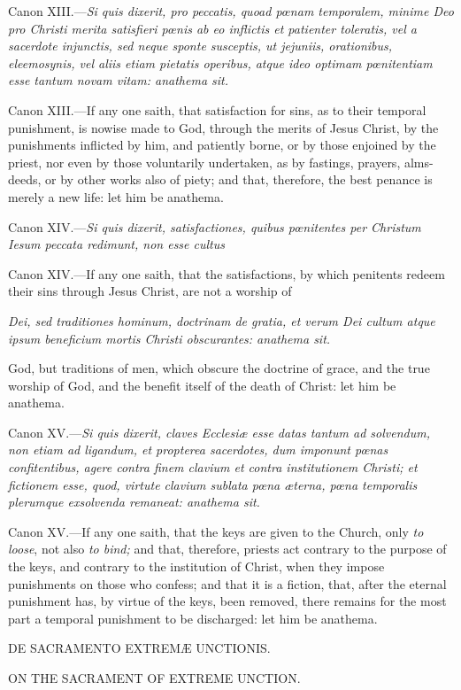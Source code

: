Canon XIII.—\emph{Si quis dixerit, pro peccatis, quoad pœnam temporalem, minime Deo pro Christi merita satisfieri pœnis ab eo inflictis et patienter toleratis, vel a sacerdote injunctis, sed neque sponte susceptis, ut jejuniis, orationibus, eleemosynis, vel aliis etiam pietatis operibus, atque ideo optimam pœnitentiam esse tantum novam vitam: anathema sit.}

Canon XIII.—If any one saith, that satisfaction for sins, as to their temporal punishment, is nowise made to God, through the merits of Jesus Christ, by the punishments inflicted by him, and patiently borne, or by those enjoined by the priest, nor even by those voluntarily undertaken, as by fastings, prayers, alms-deeds, or by other works also of piety; and that, therefore, the best penance is merely a new life: let him be anathema.

Canon XIV.—\emph{Si quis dixerit, satisfactiones, quibus pœnitentes per Christum Iesum peccata redimunt, non esse cultus }

Canon XIV.—If any one saith, that the satisfactions, by which penitents redeem their sins through Jesus Christ, are not a worship of

\emph{Dei, sed traditiones hominum, doctrinam de gratia, et verum Dei cultum atque ipsum beneficium mortis Christi obscurantes: anathema sit.}

God, but traditions of men, which obscure the doctrine of grace, and the true worship of God, and the benefit itself of the death of Christ: let him be anathema.

Canon XV.—\emph{Si quis dixerit, claves Ecclesiæ esse datas tantum ad solvendum, non etiam ad ligandum, et propterea sacerdotes, dum imponunt pœnas confitentibus, agere contra finem clavium et contra institutionem Christi; et fictionem esse, quod, virtute clavium sublata pœna æterna, pœna temporalis plerumque exsolvenda remaneat: anathema sit.}

Canon XV.—If any one saith, that the keys are given to the Church, only \emph{to loose}, not also \emph{to bind;} and that, therefore, priests act contrary to the purpose of the keys, and contrary to the institution of Christ, when they impose punishments on those who confess; and that it is a fiction, that, after the eternal punishment has, by virtue of the keys, been removed, there remains for the most part a temporal punishment to be discharged: let him be anathema.

DE SACRAMENTO EXTREMÆ UNCTIONIS.

ON THE SACRAMENT OF EXTREME UNCTION.

